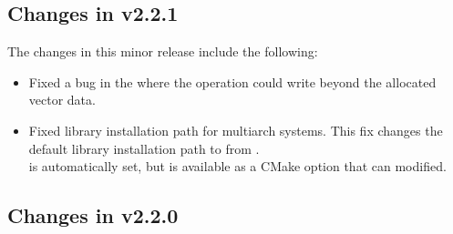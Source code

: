 \subsection*{Changes in v2.2.1}

The changes in this minor release include the following:
\begin{itemize}
\item Fixed a bug in the {\cuda} {\nvector} where the  operation
  could write beyond the allocated vector data.
\item Fixed library installation path for multiarch systems. This fix changes the default
  library installation path to 
  from .\\
   is automatically
  set, but is available as a CMake option that can modified.
\end{itemize}

\subsection*{Changes in v2.2.0}

